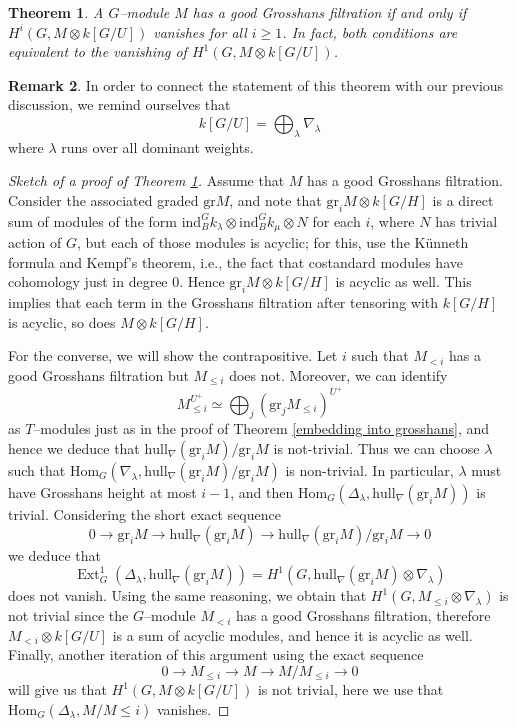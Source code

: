 \documentclass{article}
\theoremstyle{plain}
\newtheorem{Th}{Theorem}[section]
\theoremstyle{definition}
\newtheorem{Rem}[Th]{Remark}
\DeclareMathOperator{\Ext}{Ext}
\begin{document}
\begin{Th}\label{cohomological characterization of good Grosshans}
    A $G$--module $M$ has a good Grosshans filtration if and only if $H^i(G,M\otimes k[G/U])$ vanishes for all $i\geq1$. In fact, both conditions are equivalent to the vanishing of $H^1(G,M\otimes k[G/U])$. 
\end{Th}

\begin{Rem}
In order to connect the statement of this theorem with our previous discussion, we remind ourselves that 
\[
k[G/U]=\bigoplus_\lambda \nabla_\lambda
\]
where $\lambda$ runs over all dominant weights.     
\end{Rem}


\begin{proof}[Sketch of a proof of Theorem \ref{cohomological characterization of good Grosshans}]
Assume that $M$ has a good Grosshans filtration. Consider the associated graded $\mathrm{gr} M$, and note that $\mathrm{gr}_i M \otimes k[G/H]$ is a direct sum of modules of the form  $\mathrm{ind}_B^G k_\lambda \otimes \mathrm{ind}_B^G k_\mu\otimes N$ for each $i$, where $N$ has trivial action of $G$, but each of those modules is acyclic; for this, use the  Künneth formula and Kempf's theorem, i.e., the fact that costandard modules have cohomology just in degree 0. Hence $\mathrm{gr}_i M \otimes k[G/H]$ is acyclic as well. This implies that each term in the Grosshans filtration after tensoring with $k[G/H]$ is acyclic, so does $M\otimes k[G/H]$.

For the converse, we will show the contrapositive. Let $i$ such that $M_{<i}$ has a good Grosshans filtration but $M_{\leq i}$ does not. Moreover, we can identify
\[
M_{\leq i}^{U^+}\simeq  \bigoplus_j (\mathrm{gr}_j M_{\leq i})^{U^+}
\]
  as $T$--modules just as in the proof of Theorem \ref{embedding into grosshans}, and hence we deduce that $\mathrm{hull}_\nabla(\mathrm{gr}_i M)/\mathrm{gr}_i M$ is not-trivial. Thus we can choose $\lambda$ such that $\mathrm{Hom}_G(\nabla_\lambda, \mathrm{hull}_\nabla (\mathrm{gr}_i M)/\mathrm{gr}_i M)$ is non-trivial. In particular,   $\lambda$ must have Grosshans height at most  $i-1$, and then $\mathrm{Hom}_G(\Delta_\lambda, \mathrm{hull}_\nabla(\mathrm{gr}_i M))$ is trivial. Considering the short exact sequence 
\[0\to \mathrm{gr}_i M\to \mathrm{hull}_\nabla (\mathrm{gr}_i M)\to \mathrm{hull}_\nabla (\mathrm{gr}_i M)/ \mathrm{gr}_i M \to 0\]
we deduce that 
\[
\Ext_G^1(\Delta_\lambda, \mathrm{hull}_\nabla (\mathrm{gr}_i M))=H^1(G,\mathrm{hull}_\nabla (\mathrm{gr}_i M)\otimes \nabla_\lambda)
\]
does not vanish. Using the same reasoning, we obtain that $H^1(G, M_{\leq i}\otimes \nabla_\lambda)$ is not trivial since the $G$--module $M_{<i}$ has a good Grosshans filtration, therefore $M_{<i}\otimes k[G/U]$ is a sum of acyclic modules, and hence it is acyclic as well. Finally, another iteration of this argument using the exact sequence 
\[
0\to M_{\leq i} \to M \to M/M_{\leq i}\to 0
\]
will give us that $H^1(G,M\otimes k[G/U])$ is not  trivial, here we use that $\mathrm{Hom}_G(\Delta_\lambda, M/M{\leq i})$ vanishes.
\end{proof}
\end{document}
